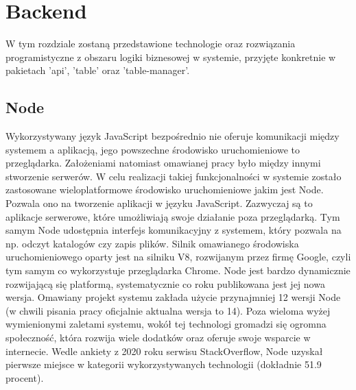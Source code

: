 \chapter{Backend}
\label{ch:backend}
W tym rozdziale zostaną przedstawione technologie oraz rozwiązania programistyczne z obszaru logiki biznesowej w systemie, przyjęte konkretnie w pakietach 'api', 'table' oraz 'table-manager'.

\label{section:node}
\section{Node}

Wykorzystywany język JavaScript bezpośrednio nie oferuje komunikacji między systemem a aplikacją, jego powszechne środowisko uruchomieniowe to przeglądarka. Założeniami natomiast omawianej pracy było między innymi stworzenie serwerów. W celu realizacji takiej funkcjonalności w systemie zostało zastosowane wieloplatformowe środowisko uruchomieniowe jakim jest Node. Pozwala ono na tworzenie aplikacji w języku JavaScript. Zazwyczaj są to aplikacje serwerowe, które umożliwiają swoje działanie poza przeglądarką. Tym samym Node udostępnia interfejs komunikacyjny z systemem, który pozwala na np. odczyt katalogów czy  zapis plików. Silnik omawianego środowiska uruchomieniowego oparty jest na silniku V8, rozwijanym przez firmę Google, czyli tym samym co wykorzystuje przeglądarka Chrome. Node jest bardzo dynamicznie rozwijającą się platformą, systematycznie co roku publikowana jest jej nowa wersja. Omawiany projekt systemu zakłada użycie przynajmniej 12 wersji Node (w chwili pisania pracy oficjalnie aktualna wersja to 14). Poza wieloma wyżej wymienionymi zaletami systemu, wokół tej technologi gromadzi się ogromna społeczność, która rozwija wiele dodatków oraz oferuje swoje wsparcie w internecie. Wedle ankiety z 2020 roku serwisu StackOverflow, Node uzyskał pierwsze miejsce w kategorii wykorzystywanych technologii (dokładnie 51.9 procent). \cite{StackOverflowSurvey, ExpressDocs}

